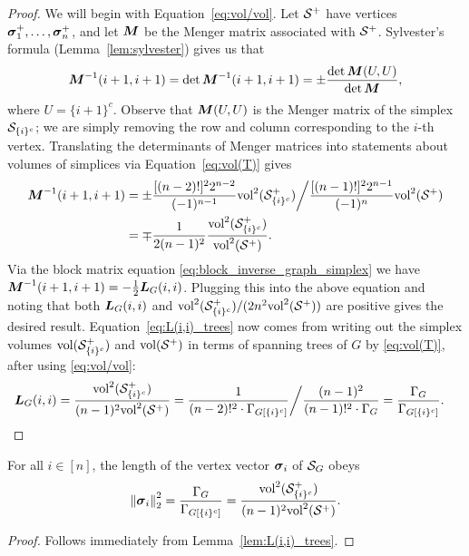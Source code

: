 \begin{proof}
	We will begin with Equation~\eqref{eq:vol/vol}. 
	Let $\mathcal{S}^+$ have vertices $\vb*{\sigma}_1^+,\dots,\vb*{\sigma}_n^+$, and let ${\vb*{M}}$ be the Menger matrix associated with $\mathcal{S}^+$. Sylvester's formula (Lemma~\ref{lem:sylvester}) gives us that 
	\begin{equation*}
	\M^{-1}(i+1,i+1) =\det\M^{-1}(i+1,i+1)= \pm \frac{\det\M(U,U)}{\det\M},
	\end{equation*}
	where $U=\{i+1\}^c$. Observe that ${\vb*{M}}(U,U)$ is the Menger matrix of the simplex $\mathcal{S}_{\{i\}^c}$; we are simply removing the row and column corresponding to the $i$-th vertex. Translating the determinants of Menger matrices into statements about volumes of simplices via Equation~\eqref{eq:vol(T)} gives 
	\begin{align*}
	{\vb*{M}}^{-1}(i+1,i+1) &= \pm \frac{[(n-2)!]^2 2^{n-2}}{(-1)^{n-1}}\textnormal{vol}^2(\mathcal{S}_{\{i\}^c}^+) \bigg / \frac{[(n-1)!]^2 2^{n-1}}{(-1)^n} \textnormal{vol}^2(\mathcal{S}^+) \\
	&= \mp \frac{1}{2(n-1)^2}\frac{\textnormal{vol}^2(\mathcal{S}_{\{i\}^c}^+)}{\textnormal{vol}^2(\mathcal{S}^+)}. 
	\end{align*} 
	Via the block matrix equation \eqref{eq:block_inverse_graph_simplex} we have ${\vb*{M}}^{-1}(i+1,i+1) = -\frac{1}{2}\vb*{L}_G(i,i)$. Plugging this into the above equation and noting that both $\vb*{L}_G(i,i)$ and $\textnormal{vol}^2(\mathcal{S}_{\{i\}^c}^+)/(2n^2\textnormal{vol}^2(\mathcal{S}^+))$ are positive  gives the desired result. 
	Equation~\eqref{eq:L(i,i)_trees} now comes from writing out the  simplex volumes $\textnormal{vol}(\mathcal{S}_{\{i\}^c}^+)$ and $\textnormal{vol}(\mathcal{S}^+)$ in terms of spanning trees of $G$ by \eqref{eq:vol(T)}, after using \eqref{eq:vol/vol}:
	\begin{align*}
	\vb*{L}_G(i,i)  &= \frac{\textnormal{vol}^2(\mathcal{S}^+_{\{i\}^c})}{(n-1)^2\textnormal{vol}^2(\mathcal{S}^+)} = \frac{1}{(n-2)!^2\cdot \Gamma_{G[{\{i\}^c}]}} \bigg/ \frac{(n-1)^2}{(n-1)!^2\cdot \Gamma_G} = \frac{\Gamma_{G}}{\Gamma_{G[{\{i\}^c}]}}.\qedhere
	\end{align*}
\end{proof}

\begin{corollary}
	For all $i\in[n]$, the length of the vertex vector $\vb*{\sigma}_i$ of $\mathcal{S}_G$ obeys
	\begin{equation}
	\label{eq:||sv_i||_vol}
	\norm{\vb*{\sigma}_i}_2^2 = \frac{\Gamma_G}{\Gamma_{G[{\{i\}^c}]}} = \frac{\textnormal{vol}^2(\mathcal{S}_{\{i\}^c}^+)}{(n-1)^2\textnormal{vol}^2(\mathcal{S}^+)}.
	\end{equation}
\end{corollary}
\begin{proof}
	Follows immediately from Lemma~\ref{lem:L(i,i)_trees}. 
\end{proof}

